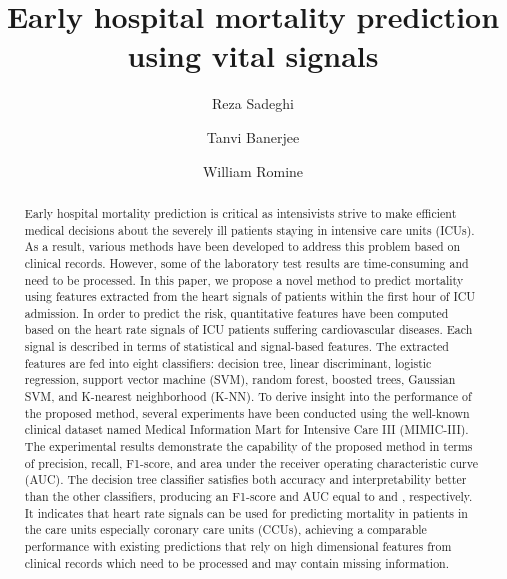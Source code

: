 \documentclass[3p]{elsarticle}
\begin{document}
\begin{frontmatter}






\title{Early hospital mortality prediction using vital signals}




\author[wm]{Reza Sadeghi}

\author[wm]{Tanvi Banerjee}

\author[mines]{William Romine}

\address[wm]{Department of Computer Science and Engineering, Kno.e.sis Research Center, Wright State University, Dayton, OH, USA}

\address[mines]{Department of Biological Sciences, Wright State University, Dayton, OH, USA}




\begin{abstract}
Early hospital mortality prediction is critical as intensivists strive to make efficient medical decisions about the severely ill patients staying in intensive care units (ICUs). As a result, various methods have been developed to address this problem based on clinical records. However, some of the laboratory test results are time-consuming and need to be processed. In this paper, we propose a novel method to predict mortality using features extracted from the heart signals of patients within the first hour of ICU admission. In order to predict the risk, quantitative features have been computed based on the heart rate signals of ICU patients suffering cardiovascular diseases. Each signal is described in terms of  statistical and signal-based features. The extracted features are fed into eight classifiers: decision tree, linear discriminant, logistic regression, support vector machine (SVM), random forest, boosted trees, Gaussian SVM, and K-nearest neighborhood (K-NN). To derive insight into the performance of the proposed method, several experiments have been conducted using the well-known clinical dataset named Medical Information Mart for Intensive Care III (MIMIC-III). The experimental results demonstrate the capability of the proposed method in terms of precision, recall, F1-score, and area under the receiver operating characteristic curve (AUC). The decision tree classifier satisfies both accuracy and interpretability better than the other classifiers, producing an F1-score and AUC equal to  and , respectively. It indicates that heart rate signals can be used for predicting mortality in patients in the care units especially coronary care units (CCUs), achieving a comparable performance with existing predictions that rely on high dimensional features from clinical records which need to be processed and may contain missing information.


\end{abstract}
\end{frontmatter}
\end{document}
